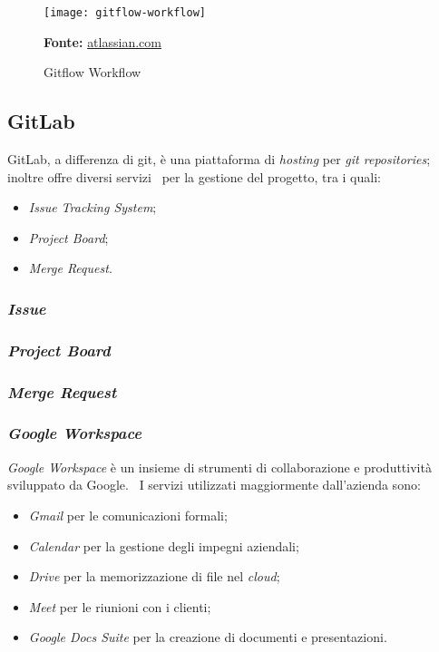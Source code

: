 \vspace{20pt}
  \begin{figure}[!ht]
    \begin{center}
      \texttt{[image: gitflow-workflow]}
      \caption{Gitflow Workflow}
      \textbf{Fonte:} \href{https://www.atlassian.com}{atlassian.com}
    \end{center}
  \end{figure}
\vspace{20pt} 

\subsection{GitLab}
GitLab, a differenza di git, è una piattaforma di \emph{hosting} per \emph{git repositories}; inoltre offre diversi servizi \
per la gestione del progetto, tra i quali:

\begin{itemize}
  \item \emph{Issue Tracking System};
  \item \emph{Project Board};
  \item \emph{Merge Request}.
\end{itemize}

\subsubsection{\emph{Issue}}


\subsubsection{\emph{Project Board}}

\subsubsection{\emph{Merge Request}}


\subsubsection{\emph{Google Workspace}}
\emph{Google Workspace} è un insieme di strumenti di collaborazione e produttività sviluppato da Google. \
I servizi utilizzati maggiormente dall'azienda sono:

\begin{itemize}
  \item \emph{Gmail} per le comunicazioni formali;
  \item \emph{Calendar} per la gestione degli impegni aziendali;
  \item \emph{Drive} per la memorizzazione di file nel \emph{cloud};
  \item \emph{Meet} per le riunioni con i clienti;
  \item \emph{Google Docs Suite} per la creazione di documenti e presentazioni.
\end{itemize}

